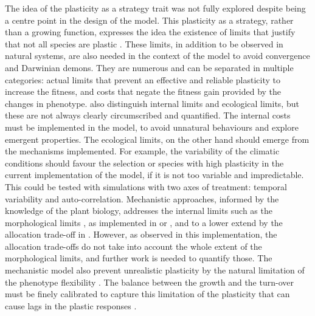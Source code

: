 The idea of the plasticity as a strategy trait \parencite{bradshaw_evolutionary_1965, bradshaw_unravelling_2006} was not fully explored despite being a centre point in the design of the model. This plasticity as a strategy, rather than a growing function, expresses the idea the existence of limits that justify that not all species are plastic \parencite{dewitt_costs_1998 ,  van_kleunen_constraints_2005, valladares_ecological_2007, auld_re-evaluationg_2009}. These limits, in addition to be observed in natural systems, are also needed in the context of the model to avoid convergence and Darwinian demons. They are numerous and can be separated in multiple categories: actual limits that prevent an effective and reliable plasticity to increase the fitness, and costs that negate the fitness gain provided by the changes in phenotype. \cite{valladares_ecological_2007} also distinguish internal limits and ecological limits, but these are not always clearly circumscribed and quantified. The internal costs must be implemented in the model, to avoid unnatural behaviours and explore emergent properties. The ecological limits, on the other hand should emerge from the mechanisms implemented. For example, the variability of the climatic conditions should favour the selection or species with high plasticity in the current implementation of the model, if it is not too variable and impredictable. This could be tested with simulations with two axes of treatment: temporal variability and auto-correlation. Mechanistic approaches, informed by the knowledge of the plant biology, addresses the internal limits such as the morphological limits \parencite{valladares_ecological_2007}, as implemented in \cite{maire_plasticity_2013} or \cite{lohier_analyse_2016}, and to a lower extend by the allocation trade-off in \model. However, as observed in this implementation, the allocation trade-offs do not take into account the whole extent of the morphological limits, and further work is needed to quantify those. The mechanistic model also prevent unrealistic plasticity by the natural limitation of the phenotype flexibility \parencite{forsman_rethinking_2014}. The balance between the growth and the turn-over must be finely calibrated to capture this limitation of the plasticity that can cause lags in the plastic responses \parencite{dewitt_costs_1998}. %

